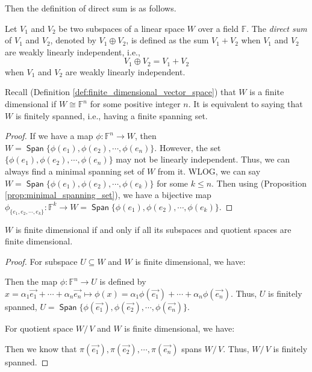 \documentclass[
	11pt, %
	fleqn, %
	a4paper, %
]{LegrandOrangeBook}
\newcommand{\quotient}[2]{#1/\, #2} %
\newcommand{\F}{\mathbb{F}} %
\DeclareMathOperator{\Span}{\mathsf{Span}}
\begin{document}
Then the definition of direct sum is as follows.
\begin{definition}
    Let $V_1$ and $V_2$ be two subspaces of a linear space $W$ over a field $\F$. The \emph{direct sum} of $V_1$ and $V_2$, denoted by $V_1 \oplus V_2$, is defined as the sum $V_1 + V_2$ when $V_1$ and $V_2$ are weakly linearly independent, i.e.,
    \[
        V_1 \oplus V_2 = V_1 + V_2
    \]
    when $V_1$ and $V_2$ are weakly linearly independent.    
\end{definition}

Recall (Definition \ref{def:finite_dimensional_vector_space}) that $W$ is a finite dimensional if $W \cong \F^n$ for some positive integer $n$. It is equivalent to saying that $W$ is finitely spanned, i.e., having a finite spanning set.

\begin{proof}
    If we have a map $\phi : \F^n \to W$, then $W = \Span\{\phi(e_1), \phi(e_2), \cdots, \phi(e_n)\}$. However, the set $\{\phi(e_1), \phi(e_2), \cdots, \phi(e_n)\}$ may not be linearly independent. Thus, we can always find a minimal spanning set of $W$ from it. WLOG, we can say $W = \Span\{\phi(e_1), \phi(e_2), \cdots, \phi(e_k)\}$ for some $k \leq n$. Then using (Proposition \ref{prop:minimal_spanning_set}), we have a bijective map $\phi_{\{e_1, e_2, \cdots, e_k\}} : \F^k \to W = \Span\{\phi(e_1), \phi(e_2), \cdots, \phi(e_k)\}$.
\end{proof}

\begin{proposition} \label{prop:finite_dimensional_subspace_quotient_space}
    $W$ is finite dimensional if and only if all its subspaces and quotient spaces are finite dimensional.
\end{proposition}

\begin{proof}
    For subspace $U \subseteq W$ and $W$ is finite dimensional, we have:
    \begin{center}
    \end{center}
    Then the map $\phi : \F^n \to U$ is defined by $x = \alpha_1 \vec{e_1} + \cdots + \alpha_n \vec{e_n} \mapsto \phi(x) = \alpha_1 \phi(\vec{e_1}) + \cdots + \alpha_n \phi(\vec{e_n})$. Thus, $U$ is finitely spanned, $U = \Span\{\phi(\vec{e_1}), \phi(\vec{e_2}), \cdots, \phi(\vec{e_n})\}$. 

    For quotient space $\quotient{W}{V}$ and $W$ is finite dimensional, we have:
    \begin{center}
    \end{center}
    Then we know that $\pi(\vec{e_1}), \pi(\vec{e_2}), \cdots, \pi(\vec{e_n})$ spans $\quotient{W}{V}$. Thus, $\quotient{W}{V}$ is finitely spanned.
\end{proof}
\end{document}
